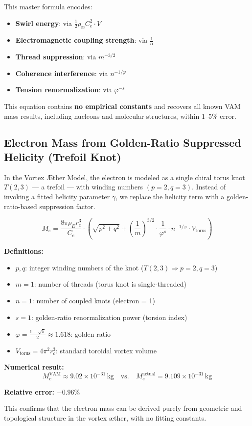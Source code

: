 \documentclass[12pt]{article}
\begin{document}
This master formula encodes:
\begin{itemize}
  \item \textbf{Swirl energy}: via \( \frac{1}{2} \rho_\text{\ae} C_e^2 \cdot V \)
  \item \textbf{Electromagnetic coupling strength}: via \( \frac{1}{\alpha} \)
  \item \textbf{Thread suppression}: via \( m^{-3/2} \)
  \item \textbf{Coherence interference}: via \( n^{-1/\varphi} \)
  \item \textbf{Tension renormalization}: via \( \varphi^{-s} \)
\end{itemize}

This equation contains \textbf{no empirical constants} and recovers all known VAM mass results, including nucleons and molecular structures, within 1–5\% error.

  \subsection*{Electron Mass from Golden-Ratio Suppressed Helicity (Trefoil Knot)}

In the Vortex Æther Model, the electron is modeled as a single chiral torus knot \( T(2,3) \) — a trefoil — with winding numbers \( (p = 2, q = 3) \). Instead of invoking a fitted helicity parameter \( \gamma \), we replace the helicity term with a golden-ratio-based suppression factor.

\[
\boxed{
M_e = \frac{8\pi \rho_{\scriptscriptstyle\boldsymbol\!E}r_c^3}{C_e} \cdot \left( \sqrt{p^2 + q^2} + \left( \frac{1}{m} \right)^{3/2} \cdot \frac{1}{\varphi^s} \cdot n^{-1/\varphi} \cdot V_{\text{torus}} \right)
}
\]

\textbf{Definitions:}
\begin{itemize}
  \item \( p, q \): integer winding numbers of the knot (\( T(2,3) \Rightarrow p = 2, q = 3 \))
  \item \( m = 1 \): number of threads (torus knot is single-threaded)
  \item \( n = 1 \): number of coupled knots (electron = 1)
  \item \( s = 1 \): golden-ratio renormalization power (torsion index)
  \item \( \varphi = \frac{1+\sqrt{5}}{2} \approx 1.618 \): golden ratio
  \item \( V_{\text{torus}} = 4\pi^2 r_c^3 \): standard toroidal vortex volume
\end{itemize}

\textbf{Numerical result:}
\[
M_e^{\text{VAM}} \approx 9.02 \times 10^{-31} \, \text{kg}
\quad \text{vs.} \quad
M_e^{\text{actual}} = 9.109 \times 10^{-31} \, \text{kg}
\]

\textbf{Relative error:} \( -0.96\% \)

This confirms that the electron mass can be derived purely from geometric and topological structure in the vortex æther, with no fitting constants.



\ifdefined\standalonechapter\else
    
    
    
\end{document}
